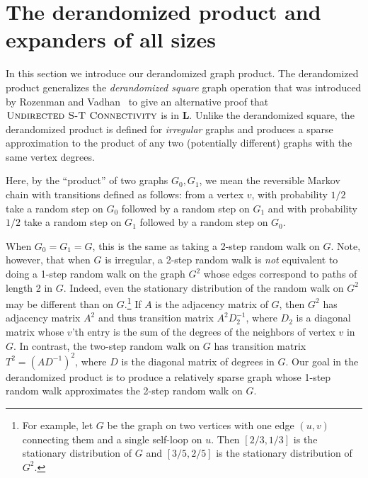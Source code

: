 \documentclass{toc}
\newcommand{\class}[1]{\mathbf{#1}}
\renewcommand{\L}{\class{L}}
\def\textprob#1{\textmd{\textsc{#1}}}
\newcommand{\USTConn}{\textprob{Undirected S-T Connectivity}}
\numberwithin{myalgctr}{section}
\theoremstyle{named}
\begin{document}
%
\section{The derandomized product and expanders of all sizes}
\label{sect:expanders}

In this section we introduce our derandomized graph product. The derandomized product generalizes the \emph{derandomized square} graph operation that was introduced by Rozenman and Vadhan~\cite{RozenmanVa05} to give an alternative proof that $\USTConn$ is in $\L$. Unlike the derandomized square, the derandomized product is defined for \emph{irregular} graphs and produces a sparse approximation to the product of any two (potentially different) graphs with the same vertex degrees.

Here, by the ``product'' of two graphs $G_0,G_1$, we mean the reversible Markov chain with transitions defined as follows: from a vertex $v$, with probability $1/2$ take a random step on $G_0$ followed by a random step on $G_1$ and with probability $1/2$ take a random step on $G_1$ followed by a random step on $G_0$. 

When $G_0=G_1=G$, this is the same as taking a 2-step random walk on $G$. Note, however, that when $G$ is irregular, a 2-step random walk is \emph{not} equivalent to doing a 1-step random walk on the graph $G^2$ whose edges correspond to paths of length 2 in $G$. Indeed, even the stationary distribution of the random walk on $G^2$ may be different than on $G$.\footnote{For example, let $G$ be the graph on two vertices with one edge $(u,v)$ connecting them and a single self-loop on $u$. Then $[2/3,1/3]$ is the stationary distribution of $G$ and $[3/5,2/5]$ is the stationary distribution of $G^2$.} If $A$ is the adjacency matrix of $G$, then $G^2$ has adjacency matrix $A^2$ and thus transition matrix
$A^2D_2^{-1}$, where $D_2$ is a diagonal matrix whose $v$'th entry is the sum of the degrees of the neighbors of vertex $v$ in $G$.  In contrast, the two-step random walk on $G$ has transition matrix $T^2=(AD^{-1})^2$, where $D$ is the diagonal matrix of degrees in $G$.
%
Our goal in the derandomized product is to produce a relatively sparse graph whose 1-step random walk approximates the 2-step random walk on $G$. 
\end{document}
